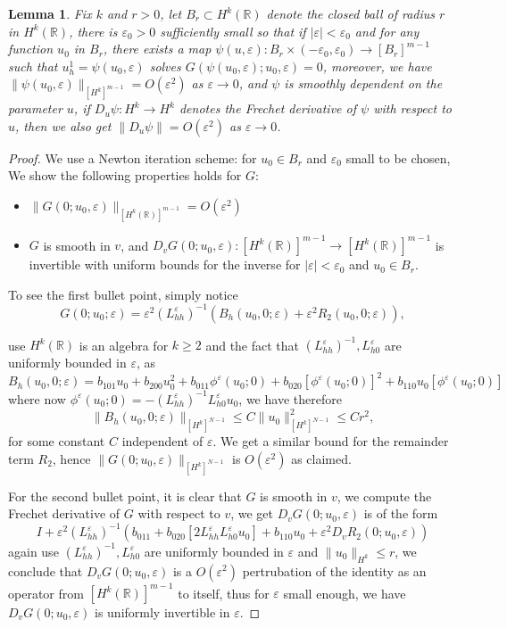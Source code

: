 \documentclass[letterpaper,11pt]{article}
\newcommand{\R}{\mathbb{R}}
\newcommand{\eps}{\varepsilon}
\numberwithin{equation}{section}
\theoremstyle{plain}
\newtheorem{lemma}[theorem]{Lemma}
\begin{document}
\begin{lemma}\label{Lemuh} Fix $k$ and $r>0$, let $B_r \subset H^k(\R)$ denote the closed ball of radius $r$ in $H^k(\R)$, there is $\eps_0>0$ sufficiently small so that if $|\eps|<\eps_0$ and for any function $u_0$ in $B_r$, there exists a map $\psi(u,\eps): B_r \times (-\eps_0,\eps_0) \to [B_r]^{m-1}$ such that $u_h^1 = \psi(u_0, \eps)$ solves $G(\psi(u_0,\eps);u_0,\eps) = 0$, moreover, we have $\|\psi(u_0,\eps)\|_{[H^k]^{m-1}} = O(\eps^2)$ as 
$\eps \to 0$, and $\psi$ is smoothly dependent on the parameter $u$, if $D_u\psi: H^k \to H^k$ denotes the Frechet derivative of $\psi$ with respect to $u$, then we also get $\|D_u\psi\| = O(\eps^2)$ as $\eps \to 0$. 
\end{lemma}
\begin{proof} We use a Newton iteration scheme: for $u_0 \in B_r$ and $\eps_0$ small to be chosen, We show the following properties holds for $G$:
\begin{itemize}
\item $\|G(0;u_0,\eps)\|_{[H^k(\R)]^{m-1}} = O(\eps^2)$
\item $G$ is smooth in $v$, and $D_v G(0; u_0, \eps):[H^k(\R)]^{m-1} \to [H^k(\R)]^{m-1}$ is invertible with uniform bounds for the inverse for $|\eps|<\eps_0$ and $u_0 \in B_r$. 
\end{itemize}

To see the first bullet point, simply notice 
\[
G(0; u_0;\eps) = \eps^2(L_{hh}^{\eps})^{-1}\left(B_h(u_0,0;\eps)+\eps^2R_2(u_0,0;\eps)\right),
\] 

use $H^k(\R)$ is an algebra for $k\ge 2$ and the fact that $(L_{hh}^\eps)^{-1}, L_{h0}^\eps$ are uniformly bounded in $\eps$, as 
\[
B_h(u_0,0;\eps) = b_{101}u_0+b_{200}u_0^2+b_{011}\phi^\eps(u_0;0)+b_{020}[\phi^\eps(u_0;0)]^2 + b_{110}u_0[\phi^\eps(u_0;0)]
\]
where now $\phi^\eps(u_0;0) = -(L_{hh}^{\eps})^{-1}L_{h0}^{\eps}u_0$, we have therefore
\[
\|B_h(u_0,0;\eps)\|_{[H^k]^{N-1}} \le C\|u_0\|_{[H^k]^{N-1}}^2 \le Cr^2,
\]
for some constant $C$ independent of $\eps$. We get a similar bound for the remainder term $R_2$, hence $\|G(0; u_0,\eps)\|_{[H^k]^{N-1}}$ is $O(\eps^2)$ as claimed.



For the second bullet point, it is clear that $G$ is smooth in $v$, we compute the Frechet derivative of $G$ with respect to $v$, we get $D_vG(0;u_0,\eps)$ is of the form 
\[ 
I + \eps^2 (L_{hh}^{\eps})^{-1}\left(b_{011}+b_{020}[2L_{hh}^{\eps}L_{h0}^{\eps}u_0]+b_{110}u_0 +\eps^2D_vR_2(0;u_0,\eps)\right)
\] 
again use $(L_{hh}^\eps)^{-1}, L_{h0}^\eps$ are uniformly bounded in $\eps$ and $\|u_0\|_{H^k} \le r$, we conclude that $D_vG(0; u_0, \eps)$ is a $O(\eps^2)$ pertrubation of the identity as an operator from $[H^k(\R)]^{m-1}$ to itself, thus for $\eps$ small enough, we have $D_vG(0;u_0,\eps)$ is uniformly invertible in $\eps$.



\end{proof}
\end{document}
